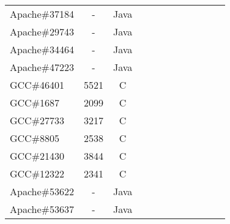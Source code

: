 \begin{table*}
\begin{tabular}{lcccc|cccc|ccc}
\midrule
Apache\#37184     &  -  & Java  &  &              &    &                                 &                   &                           &                        &   &        \\ 
Apache\#29743     &  -  & Java  &  &              &    &                                 &                   &                           &                        &   &        \\
Apache\#34464     &  -  & Java  &  &              &    &                                 &                   &                           &                        &   &        \\
Apache\#47223     &  -  & Java  &  &              &    &                                 &                   &                           &                        &   &        \\
\midrule
GCC\#46401        &  5521  & C  &  &              &    &                                 &                   &                           &                        &   &        \\
GCC\#1687         &  2099  & C  &  &              &    &                                 &                   &                           &                        &   &        \\
GCC\#27733        &  3217  & C  &  &              &    &                                 &                   &                           &                        &   &        \\
GCC\#8805         &  2538  & C  &  &              &    &                                 &                   &                           &                        &   &        \\
GCC\#21430        &  3844  & C  &  &              &    &                                 &                   &                           &                        &   &        \\
GCC\#12322        &  2341  & C  &  &              &    &                                 &                   &                           &                        &   &        \\
\midrule
\midrule
Apache\#53622     &  -  & Java  &  &              &    &                                 &                   &                           &                        &   &        \\
Apache\#53637     &  -  & Java  &  &              &    &                                 &                   &                           &                        &   &        \\

\end{tabular}
\end{table*}
